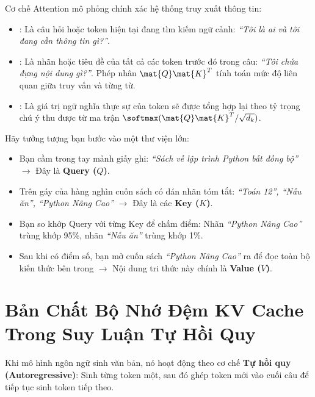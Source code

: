 \begin{definitionbox}
Cơ chế Attention mô phỏng chính xác hệ thống truy xuất thông tin:
\begin{itemize}
  \item {}: Là câu hỏi hoặc token hiện tại đang tìm kiếm ngữ cảnh: \textit{``Tôi là ai và tôi đang cần thông tin gì?''}.
  \item {}: Là nhãn hoặc tiêu đề của tất cả các token trước đó trong câu: \textit{``Tôi chứa đựng nội dung gì?''}. Phép nhân $\mat{Q}\mat{K}^T$ tính toán mức độ liên quan giữa truy vấn và từng từ.
  \item {}: Là giá trị ngữ nghĩa thực sự của token sẽ được tổng hợp lại theo tỷ trọng chú ý thu được từ ma trận $\softmax(\mat{Q}\mat{K}^T / \sqrt{d_k})$.
\end{itemize}
\end{definitionbox}

\begin{intuitionbox}
Hãy tưởng tượng bạn bước vào một thư viện lớn:
\begin{itemize}
  \item Bạn cầm trong tay mảnh giấy ghi: \textit{``Sách về lập trình Python bất đồng bộ''} $\longrightarrow$ Đây là \textbf{Query ($Q$)}.
  \item Trên gáy của hàng nghìn cuốn sách có dán nhãn tóm tắt: \textit{``Toán 12'', ``Nấu ăn'', ``Python Nâng Cao''} $\longrightarrow$ Đây là các \textbf{Key ($K$)}.
  \item Bạn so khớp Query với từng Key để chấm điểm: Nhãn \textit{``Python Nâng Cao''} trùng khớp 95\%, nhãn \textit{``Nấu ăn''} trùng khớp 1\%.
  \item Sau khi có điểm số, bạn mở cuốn sách \textit{``Python Nâng Cao''} ra để đọc toàn bộ kiến thức bên trong $\longrightarrow$ Nội dung tri thức này chính là \textbf{Value ($V$)}.
\end{itemize}
\end{intuitionbox}

\section{Bản Chất Bộ Nhớ Đệm KV Cache Trong Suy Luận Tự Hồi Quy}
\label{sec:llm-kv-cache}

Khi mô hình ngôn ngữ sinh văn bản, nó hoạt động theo cơ chế \textbf{Tự hồi quy (Autoregressive)}: Sinh từng token một, sau đó ghép token mới vào cuối câu để tiếp tục sinh token tiếp theo.

